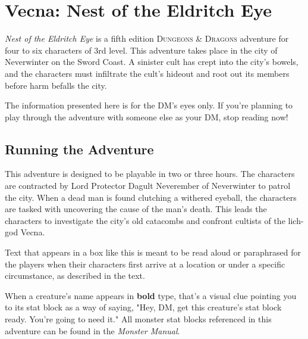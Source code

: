 \documentclass[10pt,a4paper,twoside,fancy,bg=print,twocolumn,openany,nodeprecatedcode]{dndbook}
\begin{document}
\frontmatter
\rpgMakeCover[
    image = images/adventure/VNotEE/000-00-001.something-wicked-approaches.png,
    title = Vecna: Nest of the Eldritch Eye,
    subtitle = Clean out a sinister cult from the bowels of Neverwinter.,
]

\mainmatter
\chapter*{Vecna: Nest of the Eldritch Eye}

 \textit{Nest of the Eldritch Eye} is a fifth edition \textsc{Dungeons \& Dragons} adventure for four to six characters of 3rd level. This adventure takes place in the city of Neverwinter on the Sword Coast. A sinister cult has crept into the city's bowels, and the characters must infiltrate the cult's hideout and root out its members before harm befalls the city.

The information presented here is for the DM's eyes only. If you're planning to play through the adventure with someone else as your DM, stop reading now!

\section{Running the Adventure}
This adventure is designed to be playable in two or three hours. The characters are contracted by Lord Protector Dagult Neverember of Neverwinter to patrol the city. When a dead man is found clutching a withered eyeball, the characters are tasked with uncovering the cause of the man's death. This leads the characters to investigate the city's old catacombs and confront cultists of the lich-god Vecna.

\begin{DndReadAloud}{}
Text that appears in a box like this is meant to be read aloud or paraphrased for the players when their characters first arrive at a location or under a specific circumstance, as described in the text.

\end{DndReadAloud}

When a creature's name appears in \textbf{bold} type, that's a visual clue pointing you to its stat block as a way of saying, "Hey, DM, get this creature's stat block ready. You're going to need it." All monster stat blocks referenced in this adventure can be found in the \textit{Monster Manual}.
\end{document}
